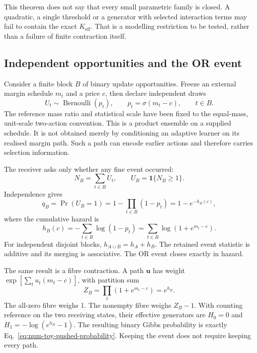 This theorem does not say that every small parametric family is closed. A quadratic, a single threshold or a generator with selected interaction terms may fail to contain the exact \(K_{\mathrm{eff}}\). That is a modelling restriction to be tested, rather than a failure of finite contraction itself.

\subsection{Independent opportunities and the OR event}

Consider a finite block \(B\) of binary update opportunities. Freeze an external margin schedule \(m_t\) and a price \(c\), then declare independent draws
\begin{equation}
 U_t\sim\operatorname{Bernoulli}(p_t),\qquad
 p_t=\sigma(m_t-c),\qquad t\in B .
 \label{eq:num-toy-fine-promotion}
\end{equation}
The reference mass ratio and statistical scale have been fixed to the equal-mass, unit-scale two-action convention. This is a product ensemble on a supplied schedule. It is not obtained merely by conditioning an adaptive learner on its realised margin path. Such a path can encode earlier actions and therefore carries selection information.

The receiver asks only whether any fine event occurred:
\[
 N_B=\sum_{t\in B}U_t,\qquad U_B=\mathbf1\{N_B\geq1\}.
\]
Independence gives
\begin{equation}
 q_B=\Pr(U_B=1)=1-\prod_{t\in B}(1-p_t)
                =1-e^{-h_B(c)},
 \label{eq:num-toy-pushed-probability}
\end{equation}
where the cumulative hazard is
\begin{equation}
 h_B(c)=-\sum_{t\in B}\log(1-p_t)
       =\sum_{t\in B}\log(1+e^{m_t-c}).
 \label{eq:hazard}
\end{equation}
For independent disjoint blocks,
\(h_{A\cup B}=h_A+h_B\).
The retained event statistic is additive and its merging is associative. The OR event closes exactly in hazard.

The same result is a fibre contraction. A path \(\mathbf u\) has weight
\(\exp[\sum_tu_t(m_t-c)]\), with partition sum
\[
 Z_B=\prod_t(1+e^{m_t-c})=e^{h_B}.
\]
The all-zero fibre weighs 1. The nonempty fibre weighs \(Z_B-1\). With counting reference on the two receiving states, their effective generators are \(H_0=0\) and
\(H_1=-\log(e^{h_B}-1)\).
The resulting binary Gibbs probability is exactly Eq.~\eqref{eq:num-toy-pushed-probability}. Keeping the event does not require keeping every path.

